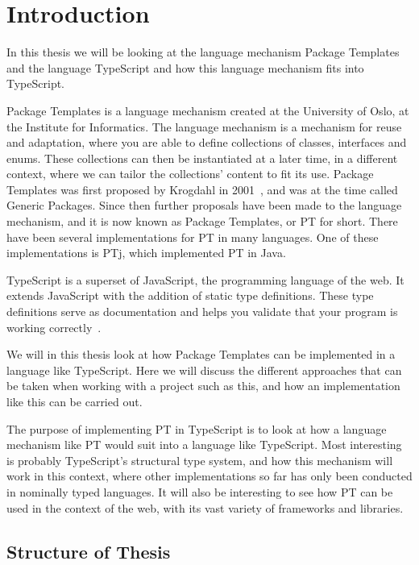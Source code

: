 
\chapter{Introduction}\label{ch:introduction}

In this thesis we will be looking at the language mechanism Package Templates and the language TypeScript and how this language mechanism fits into TypeScript.

Package Templates is a language mechanism created at the University of Oslo, at the Institute for Informatics.
The language mechanism is a mechanism for reuse and adaptation, where you are able to define collections of classes, interfaces and enums.
These collections can then be instantiated at a later time, in a different context, where we can tailor the collections' content to fit its use.
Package Templates was first proposed by Krogdahl in 2001~\cite{krogdahl:GP}, and was at the time called Generic Packages.
Since then further proposals have been made to the language mechanism, and it is now known as Package Templates, or PT for short.
There have been several implementations for PT in many languages.
One of these implementations is PTj, which implemented PT in Java.

TypeScript is a superset of JavaScript, the programming language of the web.
It extends JavaScript with the addition of static type definitions.
These type definitions serve as documentation and helps you validate that your program is working correctly~\cite{tswebsite}.

We will in this thesis look at how Package Templates can be implemented in a language like TypeScript.
Here we will discuss the different approaches that can be taken when working with a project such as this, and how an implementation like this can be carried out.


The purpose of implementing PT in TypeScript is to look at how a language mechanism like PT would suit into a language like TypeScript.
Most interesting is probably TypeScript's structural type system, and how this mechanism will work in this context, where other implementations so far has only been conducted in nominally typed languages.
It will also be interesting to see how PT can be used in the context of the web, with its vast variety of frameworks and libraries.

\section{Structure of Thesis}\label{sec:structure-of-thesis}

